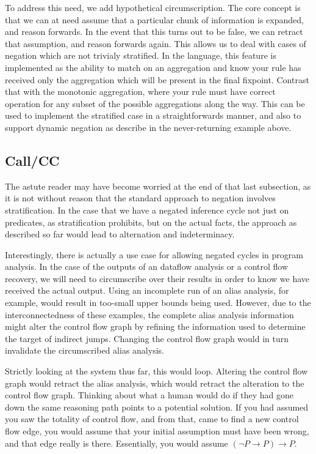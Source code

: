 To address this need, we add hypothetical circumscription.
The core concept is that we can at need assume that a particular chunk of information is expanded, and reason forwards.
In the event that this turns out to be false, we can retract that assumption, and reason forwards again.
This allows us to deal with cases of negation which are not trivialy stratified.
In the language, this feature is implemented as the ability to match on an aggregation and know your rule has received only the aggregation which will be present in the final fixpoint.
Contrast that with the monotonic aggregation, where your rule must have correct operation for any subset of the possible aggregations along the way.
This can be used to implement the stratified case in a straightforwards manner, and also to support dynamic negation as describe in the never-returning example above.

\subsection{Call/CC}
The astute reader may have become worried at the end of that last subsection, as it is not without reason that the standard approach to negation involves stratification.
In the case that we have a negated inference cycle not just on predicates, as stratification prohibits, but on the actual facts, the approach as described so far would lead to alternation and indeterminacy.

Interestingly, there is actually a use case for allowing negated cycles in program analysis.
In the case of the outputs of an dataflow analysis or a control flow recovery, we will need to circumscribe over their results in order to know we have received the actual output.
Using an incomplete run of an alias analysis, for example, would result in too-small upper bounds being used.
However, due to the interconnectedness of these examples, the complete alias analysis information might alter the control flow graph by refining the information used to determine the target of indirect jumps.
Changing the control flow graph would in turn invalidate the circumscribed alias analysis.

Strictly looking at the system thus far, this would loop.
Altering the control flow graph would retract the alias analysis, which would retract the alteration to the control flow graph.
Thinking about what a human would do if they had gone down the same reasoning path points to a potential solution.
If you had assumed you saw the totality of control flow, and from that, came to find a new control flow edge, you would assume that your initial assumption must have been wrong, and that edge really is there.
Essentially, you would assume $(\neg P \rightarrow P) \rightarrow P$.

